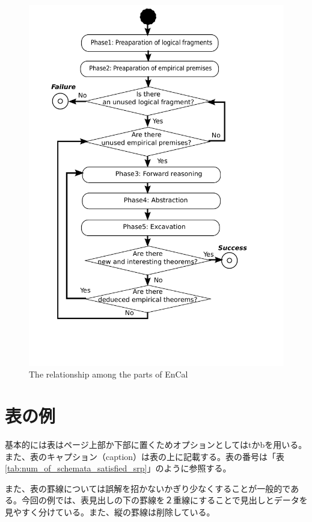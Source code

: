 \documentclass[12pt,dvipdfmx]{jreport}
\begin{document}
 \begin{figure}[tb]
   \begin{center}
     \includegraphics[scale=0.6]{fig/reasoning_engine.pdf}
     \caption{The relationship among the parts of EnCal}
     \label{fig:reasoning_engine}
   \end{center}
 \end{figure}

 \section{表の例}
 
 基本的には表はページ上部か下部に置くためオプションとしてはtかbを用いる。また、表のキャプション（caption）は表の上に記載する。表の番号は「表\ref{tab:num_of_schemata_satisfied_srp}」のように参照する。

また、表の罫線については誤解を招かないかぎり少なくすることが一般的である。今回の例では、表見出しの下の罫線を２重線にすることで見出しとデータを見やすく分けている。また、縦の罫線は削除している。
 
\end{document}

